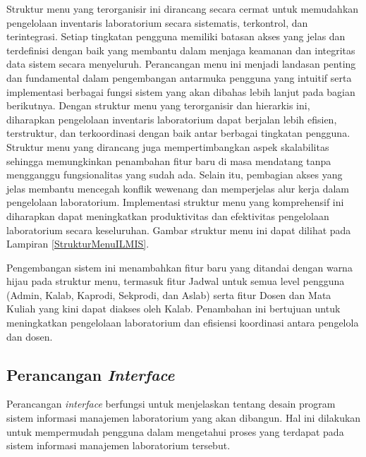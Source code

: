 Struktur menu yang terorganisir ini dirancang secara cermat untuk memudahkan pengelolaan inventaris laboratorium secara sistematis, terkontrol, dan terintegrasi. Setiap tingkatan pengguna memiliki batasan akses yang jelas dan terdefinisi dengan baik yang membantu dalam menjaga keamanan dan integritas data sistem secara menyeluruh. Perancangan menu ini menjadi landasan penting dan fundamental dalam pengembangan antarmuka pengguna yang intuitif serta implementasi berbagai fungsi sistem yang akan dibahas lebih lanjut pada bagian berikutnya. Dengan struktur menu yang terorganisir dan hierarkis ini, diharapkan pengelolaan inventaris laboratorium dapat berjalan lebih efisien, terstruktur, dan terkoordinasi dengan baik antar berbagai tingkatan pengguna. Struktur menu yang dirancang juga mempertimbangkan aspek skalabilitas sehingga memungkinkan penambahan fitur baru di masa mendatang tanpa mengganggu fungsionalitas yang sudah ada. Selain itu, pembagian akses yang jelas membantu mencegah konflik wewenang dan memperjelas alur kerja dalam pengelolaan laboratorium. Implementasi struktur menu yang komprehensif ini diharapkan dapat meningkatkan produktivitas dan efektivitas pengelolaan laboratorium secara keseluruhan. Gambar struktur menu ini dapat dilihat pada Lampiran \ref{StrukturMenuILMIS}.

Pengembangan sistem ini menambahkan fitur baru yang ditandai dengan warna hijau pada struktur menu, termasuk fitur Jadwal untuk semua level pengguna (Admin, Kalab, Kaprodi, Sekprodi, dan Aslab) serta fitur Dosen dan Mata Kuliah yang kini dapat diakses oleh Kalab. Penambahan ini bertujuan untuk meningkatkan pengelolaan laboratorium dan efisiensi koordinasi antara pengelola dan dosen.

\subsection{Perancangan \textit{Interface}}
Perancangan \textit{interface} berfungsi untuk menjelaskan tentang desain program sistem informasi manajemen laboratorium yang akan dibangun. Hal ini dilakukan untuk mempermudah pengguna dalam mengetahui proses yang terdapat pada sistem informasi manajemen laboratorium tersebut.

